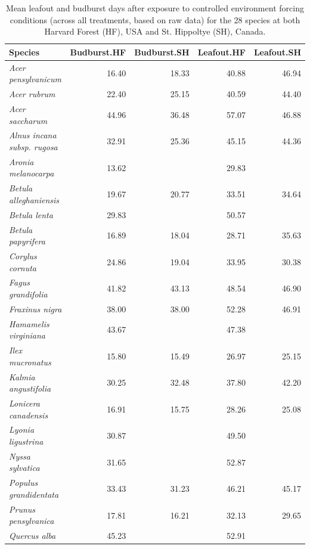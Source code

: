 \documentclass{article}
\begin{document}
\begin{table}[ht]
\centering
\caption{Mean leafout and budburst days after exposure to controlled environment forcing conditions (across all treatments, based on raw data) for the 28 species at both Harvard Forest (HF), USA and St. Hippoltye (SH), Canada.} 
\begin{tabular}{lrrrr}
  \hline
Species & Budburst.HF & Budburst.SH & Leafout.HF & Leafout.SH \\ 
  \hline
\textit{Acer pensylvanicum} & 16.40 & 18.33 & 40.88 & 46.94 \\ 
  \textit{Acer rubrum} & 22.40 & 25.15 & 40.59 & 44.40 \\ 
  \textit{Acer saccharum} & 44.96 & 36.48 & 57.07 & 46.88 \\ 
  \textit{Alnus incana subsp. rugosa} & 32.91 & 25.36 & 45.15 & 44.36 \\ 
  \textit{Aronia melanocarpa} & 13.62 &  & 29.83 &  \\ 
  \textit{Betula alleghaniensis} & 19.67 & 20.77 & 33.51 & 34.64 \\ 
  \textit{Betula lenta} & 29.83 &  & 50.57 &  \\ 
  \textit{Betula papyrifera} & 16.89 & 18.04 & 28.71 & 35.63 \\ 
  \textit{Corylus cornuta} & 24.86 & 19.04 & 33.95 & 30.38 \\ 
  \textit{Fagus grandifolia} & 41.82 & 43.13 & 48.54 & 46.90 \\ 
  \textit{Fraxinus nigra} & 38.00 & 38.00 & 52.28 & 46.91 \\ 
  \textit{Hamamelis virginiana} & 43.67 &  & 47.38 &  \\ 
  \textit{Ilex mucronatus} & 15.80 & 15.49 & 26.97 & 25.15 \\ 
  \textit{Kalmia angustifolia} & 30.25 & 32.48 & 37.80 & 42.20 \\ 
  \textit{Lonicera canadensis} & 16.91 & 15.75 & 28.26 & 25.08 \\ 
  \textit{Lyonia ligustrina} & 30.87 &  & 49.50 &  \\ 
  \textit{Nyssa sylvatica} & 31.65 &  & 52.87 &  \\ 
  \textit{Populus grandidentata} & 33.43 & 31.23 & 46.21 & 45.17 \\ 
  \textit{Prunus pensylvanica} & 17.81 & 16.21 & 32.13 & 29.65 \\ 
  \textit{Quercus alba} & 45.23 &  & 52.91 &  \\ 

\end{tabular}
\end{table}
\end{document}
